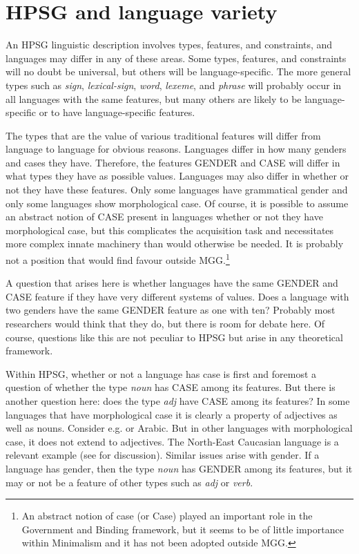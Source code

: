 \documentclass[output=paper]{langsci/langscibook}
\begin{document}
\section{HPSG and language variety}\label{sec-5:4}

An \gls{HPSG} linguistic description involves types, features, and constraints,
and languages may differ in any of these areas. Some types, features, and
constraints will no doubt be universal, but others will be language-specific.
The more general types such as \emph{sign}, \emph{lexical-sign}, \emph{word},
\emph{lexeme}, and \emph{phrase} will probably occur in all languages with the
same features, but many others are likely to be language-specific or to have
language-specific features.

The types that are the value of various traditional features will differ from
language to language for obvious reasons. Languages differ in how many genders
and cases they have. Therefore, the features GENDER and CASE will differ in
what types they have as possible values. Languages may also differ in whether
or not they have these features. Only some languages have grammatical gender
and only some languages show morphological case. Of course, it is possible to
assume an abstract notion of CASE present in languages whether or not they have
morphological case, but this complicates the acquisition task and necessitates
more complex innate machinery than would otherwise be needed. It is probably
not a position that would find favour outside MGG.\footnote{An abstract notion
of case (or Case) played an important role in the Government and Binding
framework, but it seems to be of little importance within Minimalism and it has
not been adopted outside \gls{MGG}.}

A question that arises here is whether languages have the same GENDER and CASE
feature if they have very different systems of values. Does a language with two
genders have the same GENDER feature as one with ten? Probably most researchers
would think that they do, but there is room for debate here. Of course,
questions like this are not peculiar to \gls{HPSG} but arise in any theoretical
framework.

Within \gls{HPSG}, whether or not a language has case is first and foremost a
question of whether the type \emph{noun} has CASE among its features. But there
is another question here: does the type \emph{adj} have CASE among its
features?  In some languages that have morphological case it is clearly a
property of adjectives as well as nouns. Consider e.g.  or Arabic.
But in other languages with morphological case, it does not extend to
adjectives. The North-East Caucasian language  is a relevant example
(see \citealt{BonBroChuCor2016} for discussion). Similar issues arise with
gender. If a language has gender, then the type \emph{noun} has GENDER among
its features, but it may or not be a feature of other types such as \emph{adj} or
\emph{verb}.
\end{document}
